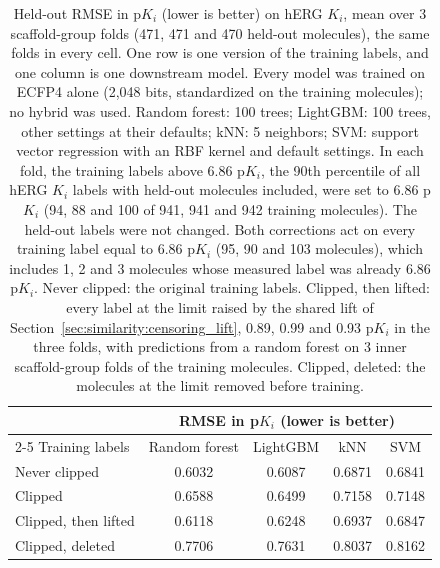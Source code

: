 \begin{table}[htbp]
\centering
\small
\begin{tabular}{@{}lcccc@{}}
\toprule
 & \multicolumn{4}{c}{RMSE in p$K_i$ (lower is better)} \\
\cmidrule(l){2-5}
Training labels & Random forest & LightGBM & kNN & SVM \\
\midrule
Never clipped & 0.6032 & 0.6087 & 0.6871 & 0.6841 \\
Clipped & 0.6588 & 0.6499 & 0.7158 & 0.7148 \\
Clipped, then lifted & 0.6118 & 0.6248 & 0.6937 & 0.6847 \\
Clipped, deleted & 0.7706 & 0.7631 & 0.8037 & 0.8162 \\
\bottomrule
\end{tabular}
\caption[Correcting clipped training labels on hERG $K_i$ with ECFP4]{Held-out RMSE in p$K_i$ (lower is better) on hERG $K_i$, mean over 3 scaffold-group folds (471, 471 and 470 held-out molecules), the same folds in every cell. One row is one version of the training labels, and one column is one downstream model. Every model was trained on ECFP4 alone (2,048 bits, standardized on the training molecules); no hybrid was used. Random forest: 100 trees; LightGBM: 100 trees, other settings at their defaults; kNN: 5 neighbors; SVM: support vector regression with an RBF kernel and default settings. In each fold, the training labels above 6.86 p$K_i$, the 90th percentile of all hERG $K_i$ labels with held-out molecules included, were set to 6.86 p$K_i$ (94, 88 and 100 of 941, 941 and 942 training molecules). The held-out labels were not changed. Both corrections act on every training label equal to 6.86 p$K_i$ (95, 90 and 103 molecules), which includes 1, 2 and 3 molecules whose measured label was already 6.86 p$K_i$. Never clipped: the original training labels. Clipped, then lifted: every label at the limit raised by the shared lift of Section~\ref{sec:similarity:censoring_lift}, 0.89, 0.99 and 0.93 p$K_i$ in the three folds, with predictions from a random forest on 3 inner scaffold-group folds of the training molecules. Clipped, deleted: the molecules at the limit removed before training.}
\label{tab:ch6prelim_censor_ecfp4}
\end{table}

